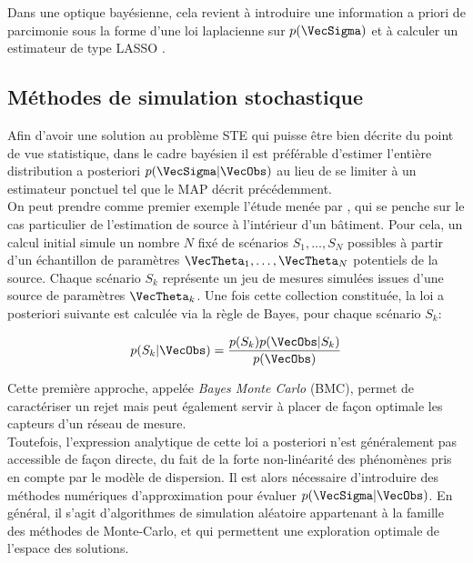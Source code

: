 Dans une optique bayésienne, cela revient à introduire une information a priori de parcimonie sous la forme d'une loi laplacienne sur $p(\VecSigma)$ et à calculer un estimateur de type LASSO \cite{Tibshirani1996}.


\subsection{Méthodes de simulation stochastique}

Afin d'avoir une solution au problème STE qui puisse être bien décrite du point de vue statistique, dans le cadre bayésien il est préférable d'estimer l'entière distribution a posteriori $p(\VecSigma | \VecObs)$ au lieu de se limiter à un estimateur ponctuel tel que le MAP décrit précédemment.\\


On peut prendre comme premier exemple l'étude menée par \cite{Sohn2002}, qui se penche sur le cas particulier de l'estimation de source à l'intérieur d'un bâtiment. Pour cela, un calcul initial simule un nombre $N$ fixé de scénarios $S_1,\dots,S_N$ possibles à partir d'un échantillon de paramètres $\VecTheta_1, \dots, \VecTheta_N$ potentiels de la source. Chaque scénario $S_k$ représente un jeu de mesures simulées issues d'une source de paramètres $\VecTheta_k$. Une fois cette collection constituée, la loi a posteriori suivante est calculée via la règle de Bayes, pour chaque scénario $S_k$:

\begin{equation}
\label{eq_bayes_monte_carlo}
p(S_k|\VecObs) = \dfrac{p(S_k)p(\VecObs | S_k)}{p(\VecObs)}
\end{equation}

Cette première approche, appelée \textit{Bayes Monte Carlo} (BMC), permet de caractériser un rejet mais peut également servir à placer de façon optimale les capteurs d'un réseau de mesure. \\

Toutefois, l'expression analytique de cette loi a posteriori n'est généralement  pas accessible de façon directe, du fait de la forte non-linéarité des phénomènes pris en compte par le modèle de dispersion. Il est alors nécessaire d'introduire des méthodes numériques d'approximation pour évaluer  $p(\VecSigma | \VecObs)$. En général, il s'agit d'algorithmes de simulation aléatoire appartenant à la famille des méthodes de Monte-Carlo, et qui permettent une exploration optimale de l'espace des solutions.\\

